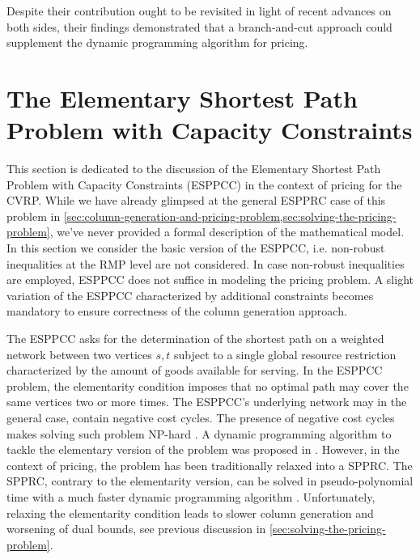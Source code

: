 Despite their contribution ought to be revisited in light of recent advances on both sides,
their findings demonstrated that a branch-and-cut approach
could supplement the dynamic programming algorithm for pricing.

\section{The Elementary Shortest Path Problem with Capacity Constraints}
\label{sec:the-elementary-shortest-path-problem-with-capacity-constraints}

This section is dedicated to the discussion of the
Elementary Shortest Path Problem with Capacity Constraints (ESPPCC)
in the context of pricing for the CVRP.
While we have already glimpsed at the general ESPPRC case of this problem in
\cref{sec:column-generation-and-pricing-problem,sec:solving-the-pricing-problem},
we've never provided a formal description of the mathematical model.
In this section we consider the basic version of the ESPPCC,
i.e. non-robust inequalities at the RMP level are not considered.
In case non-robust inequalities are employed,
ESPPCC does not suffice in modeling the pricing problem.
A slight variation of the ESPPCC characterized by additional constraints
becomes mandatory to ensure correctness of the column generation approach.

The ESPPCC asks for the determination of the shortest path on a weighted network
between two vertices $s, t$
subject to a single global resource restriction characterized
by the amount of goods available for serving.
In the ESPPCC problem,
the elementarity condition imposes that no optimal path may
cover the same vertices two or more times.
The ESPPCC's underlying network may in the general case,
contain negative cost cycles.
The presence of negative cost cycles makes solving such problem NP-hard \parencite{dror1994}.
A dynamic programming algorithm
to tackle the elementary version of the problem
was proposed in \textcite{feillet2004}.
However, in the context of pricing, the problem has been traditionally relaxed into a SPPRC.
The SPPRC,
contrary to the elementarity version,
can be solved in pseudo-polynomial time with a much faster dynamic programming algorithm \parencite{desrochers1992}.
Unfortunately,
relaxing the elementarity condition leads to slower column generation and worsening of dual bounds,
see previous discussion in \cref{sec:solving-the-pricing-problem}.

\medskip

